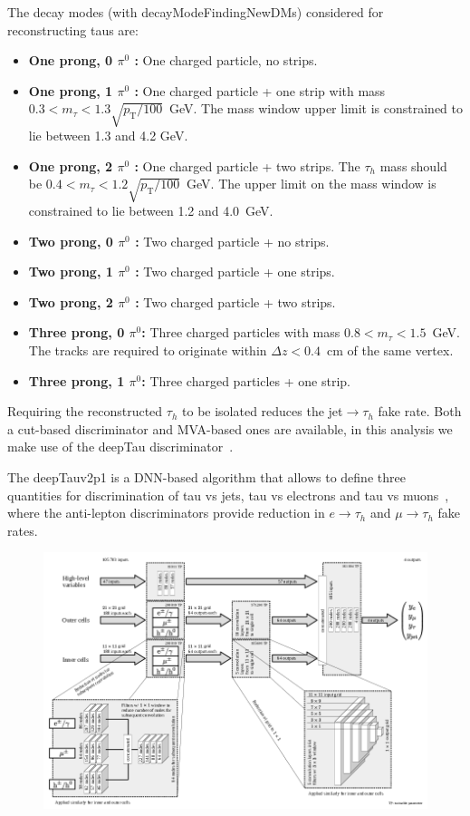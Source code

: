 The decay modes (with decayModeFindingNewDMs) considered for reconstructing taus are:
\begin{itemize}
\item \textbf{One prong, 0 $\pi^0$ :} One charged particle, no strips.
\item \textbf{One prong, 1 $\pi^0$ :} One charged particle + one strip with mass $ 0.3 < m_{\tau} < 1.3 \sqrt{p_{\text{T}}/100}$~GeV. The mass window upper limit is constrained to lie between 1.3 and 4.2 GeV.
\item \textbf{One prong, 2 $\pi^0$ :} One charged particle + two strips. The $\tau_{h}$ mass should be $0.4 < m_{\tau} < 1.2\sqrt{p_{\text{T}}/100}$~GeV. The upper limit on the mass window is constrained to lie between 1.2 and 4.0~GeV.
\item \textbf{Two prong, 0 $\pi^0$ :} Two charged particle + no strips.
\item \textbf{Two prong, 1 $\pi^0$ :} Two charged particle + one strips.
\item \textbf{Two prong, 2 $\pi^0$ :} Two charged particle + two strips.
\item \textbf{Three prong, 0 $\pi^0$: } Three charged particles with mass $0.8 < m_{\tau} < 1.5$~GeV. The tracks are required to originate within $\Delta z<0.4$~cm of the same vertex.
\item \textbf{Three prong, 1 $\pi^0$: } Three charged particles + one strip.
\end{itemize}

Requiring the reconstructed $\tau_{h}$ to be isolated reduces the
jet$\rightarrow\tau_{h}$ fake rate. Both a cut-based discriminator and  MVA-based
ones are available, in this analysis we make use of the deepTau discriminator~\cite{CMS-DP-2019-033}.

The deepTauv2p1 is a DNN-based algorithm that allows to define three quantities for discrimination of tau vs jets, tau vs electrons and tau vs muons~\cite{TauPOG}, where the anti-lepton discriminators provide reduction in $e\rightarrow\tau_h$ and $\mu\rightarrow\tau_h$ fake rates. 

\begin{figure}[!hbtp]
\centering
    \includegraphics[width=\textwidth]{Figures/deeptau.png}
\caption{}
\label{fig:4tau_ccc}
\end{figure}